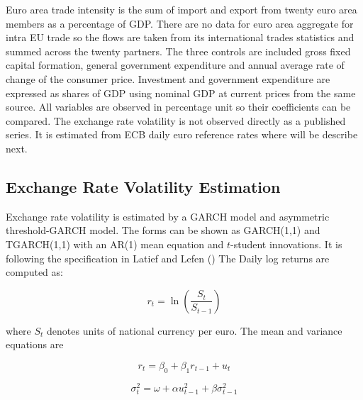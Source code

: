 \vspace{\baselineskip}

Euro area trade intensity is the sum of import and export from twenty euro area members as a percentage of GDP.
There are no data for euro area aggregate for intra EU trade so the flows are taken from its international trades statistics and summed across the twenty partners.
The three controls are included gross fixed capital formation, general government expenditure and annual average rate of change of the consumer price.
Investment and government expenditure are expressed as shares of GDP using nominal GDP at current prices from the same source.
All variables are observed in percentage unit so their coefficients can be compared.
The exchange rate volatility is not observed directly as a published series. 
It is estimated from ECB daily euro reference rates where will be describe next.

\subsection{Exchange Rate Volatility Estimation}\label{subsec:vol_est}

Exchange rate volatility is estimated by a GARCH model and asymmetric threshold-GARCH model. The forms can be shown as GARCH(1,1) and TGARCH(1,1) with an AR(1) mean equation and $t$-student innovations.
It is following the specification in Latief and Lefen (\citeyear{latief_effect_2018})
The Daily log returns are computed as:

\vspace{\baselineskip}

\begin{equation}\label{log_return}
r_t = \ln\left(\frac{S_t}{S_{t-1}}\right)
\end{equation}
\vspace{\baselineskip}

where $S_t$ denotes units of national currency per euro. The mean and variance equations are


\begin{equation}\label{mean}
r_t = \beta_0 + \beta_1 r_{t-1} + u_t
\end{equation}

\begin{equation}\label{variance}
\sigma^2_t = \omega + \alpha u^2_{t-1} + \beta \sigma^2_{t-1}    
\end{equation}

\vspace{\baselineskip}

